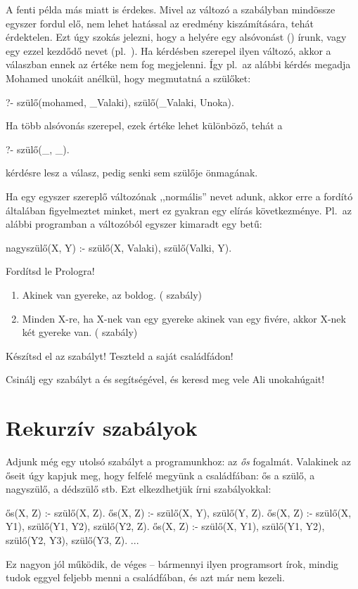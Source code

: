 A fenti példa más miatt is érdekes. Mivel az 
változó a szabályban mindössze egyszer fordul elő,
nem lehet hatással az eredmény kiszámítására, tehát
érdektelen. Ezt úgy szokás jelezni, hogy a helyére
egy alsóvonást (\pr{\_}) írunk, vagy egy ezzel
kezdődő nevet (pl.~).\index{\pr{\_}} Ha
kérdésben szerepel ilyen változó, akkor a válaszban
ennek az értéke nem fog megjelenni. Így pl.~az
alábbi kérdés megadja Mohamed unokáit anélkül, hogy
megmutatná a szülőket:
\begin{query}
?- szülő(mohamed, _Valaki), szülő(_Valaki, Unoka).
\end{query}

Ha több alsóvonás szerepel, ezek értéke lehet
különböző, tehát a
\begin{query}
?- szülő(_, _).
\end{query}
kérdésre  lesz a válasz, pedig senki sem
szülője önmagának.

Ha egy egyszer szereplő változónak ,,normális''
nevet adunk, akkor erre a fordító általában
figyelmeztet minket, mert ez gyakran egy elírás
következménye. Pl.~az alábbi programban a
 változóból egyszer kimaradt egy 
betű:
\begin{program}
nagyszülő(X, Y) :-
    szülő(X, Valaki), szülő(Valki, Y).
\end{program}

\begin{problem}
Fordítsd le Prologra!
\begin{enumerate}  
\item Akinek van gyereke, az boldog. (
  szabály)
\item Minden X-re, ha X-nek van egy gyereke akinek
  van egy fivére, akkor X-nek két gyereke
  van. ( szabály)
\end{enumerate}
\end{problem}
\begin{problem}
  Készítsd el az  szabályt!
  Teszteld a saját családfádon!
\end{problem}
\begin{problem}
  Csinálj egy  szabályt a 
  és  segítségével, és keresd meg vele Ali
  unokahúgait!
\end{problem}

\section{Rekurzív szabályok}
Adjunk még egy utolsó szabályt a programunkhoz: az
\emph{ős} fogalmát. Valakinek az őseit úgy kapjuk
meg, hogy felfelé megyünk a családfában: ős a szülő,
a nagyszülő, a dédszülő stb. Ezt elkezdhetjük írni
szabályokkal:
\begin{program}
ős(X, Z) :- szülő(X, Z).
ős(X, Z) :- szülő(X, Y), szülő(Y, Z).
ős(X, Z) :-
    szülő(X, Y1), szülő(Y1, Y2), szülő(Y2, Z).
ős(X, Z) :-
    szülő(X, Y1), szülő(Y1, Y2),
    szülő(Y2, Y3), szülő(Y3, Z).
...
\end{program}
Ez nagyon jól működik, de véges -- bármennyi ilyen
programsort írok, mindig tudok eggyel feljebb menni
a családfában, és azt már nem kezeli.

